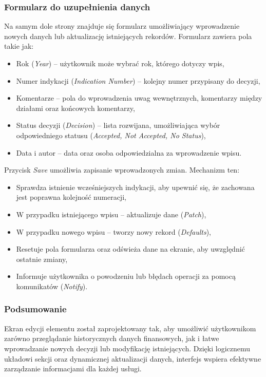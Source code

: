 \subsubsection{Formularz do uzupełnienia danych}
Na samym dole strony znajduje się formularz umożliwiający wprowadzenie nowych danych lub aktualizację istniejących rekordów. Formularz zawiera pola takie jak:
\begin{itemize}
    \item {Rok (\textit{Year})} -- użytkownik może wybrać rok, którego dotyczy wpis,
    \item {Numer indykacji (\textit{Indication Number})} -- kolejny numer przypisany do decyzji,
    \item {Komentarze} -- pola do wprowadzenia uwag wewnętrznych, komentarzy między działami oraz końcowych komentarzy,
    \item {Status decyzji (\textit{Decision})} -- lista rozwijana, umożliwiająca wybór odpowiedniego statusu (\textit{Accepted, Not Accepted, No Status}),
    \item {Data i autor} -- data oraz osoba odpowiedzialna za wprowadzenie wpisu.
\end{itemize}

Przycisk \textit{Save} umożliwia zapisanie wprowadzonych zmian. Mechanizm ten:
\begin{itemize}
    \item Sprawdza istnienie wcześniejszych indykacji, aby upewnić się, że zachowana jest poprawna kolejność numeracji,
    \item W przypadku istniejącego wpisu -- aktualizuje dane (\textit{Patch}),
    \item W przypadku nowego wpisu -- tworzy nowy rekord (\textit{Defaults}),
    \item Resetuje pola formularza oraz odświeża dane na ekranie, aby uwzględnić ostatnie zmiany,
    \item Informuje użytkownika o powodzeniu lub błędach operacji za pomocą komunikatów (\textit{Notify}).
\end{itemize}

\subsubsection{Podsumowanie}
Ekran edycji elementu został zaprojektowany tak, aby umożliwić użytkownikom zarówno przeglądanie historycznych danych finansowych, jak i łatwe wprowadzanie nowych decyzji lub modyfikację istniejących. Dzięki logicznemu układowi sekcji oraz dynamicznej aktualizacji danych, interfejs wspiera efektywne zarządzanie informacjami dla każdej usługi.
